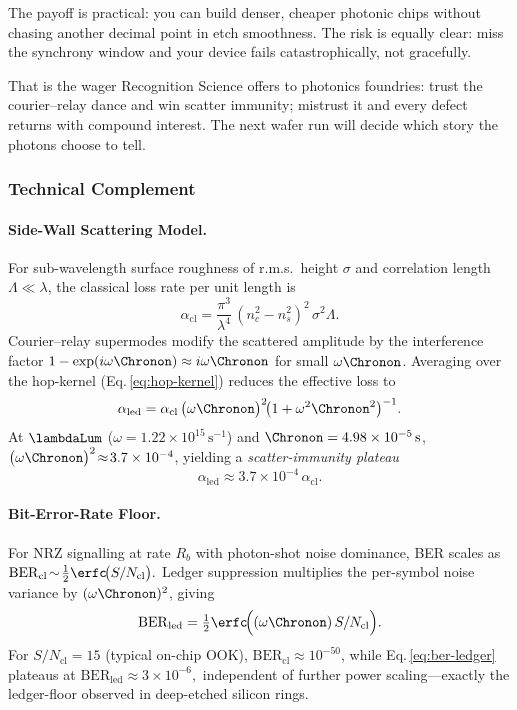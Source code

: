 \documentclass[11pt,oneside]{book}
\begin{document}
{The payoff is practical: you can build denser, cheaper photonic chips
without chasing another decimal point in etch smoothness.  
The risk is equally clear: miss the synchrony window and your device
fails catastrophically, not gracefully.  

That is the wager Recognition Science offers to photonics foundries:
trust the courier–relay dance and win scatter immunity; mistrust it
and every defect returns with compound interest.  The next wafer run
will decide which story the photons choose to tell.


\subsubsection*{Technical Complement}

\paragraph{Side-Wall Scattering Model.}
For sub-wavelength surface roughness of r.m.s.\ height
$\sigma$ and correlation length $\Lambda\!\ll\!\lambda$,
the classical loss rate per unit length is
\[
   \alpha_{\text{cl}}
   =
   \frac{\pi^{3}}{\lambda^{4}}\,
   (n_{c}^{2}-n_{s}^{2})^{2}\,
   \sigma^{2}\Lambda.
   \label{eq:alpha-classic}
\]
Courier–relay supermodes modify the scattered amplitude by the
interference factor
\(
   1-\exp(i\omega\Chronon)\approx
   i\omega\Chronon
\)
for small $\omega\Chronon$.  
Averaging over the hop-kernel (Eq.\,\ref{eq:hop-kernel}) reduces the
effective loss to
\[
   \alpha_{\text{led}}
   =
   \alpha_{\text{cl}}\,
   \bigl(\omega\Chronon\bigr)^{2}\!
   \bigl(1+\omega^{2}\Chronon^{2}\bigr)^{-1}.
   \label{eq:alpha-ledger}
\]
At $\lambdaLum$ (\(\omega=1.22\times10^{15}\,\mathrm{s^{-1}}\)) and
$\Chronon=4.98\times10^{-5}\,\text{s}$,
$\bigl(\omega\Chronon\bigr)^{2}\!\approx\!3.7\times10^{-4}$, yielding
a \emph{scatter-immunity plateau}
\[
   \alpha_{\text{led}}
   \approx
   3.7\times10^{-4}\,\alpha_{\text{cl}}.
\]

\paragraph{Bit-Error-Rate Floor.}
For NRZ signalling at rate $R_{b}$ with photon-shot noise dominance,
BER scales as
\(
   \mathrm{BER}_{\text{cl}}\!\sim\!
   \tfrac12\erfc\!\bigl(S/N_{\text{cl}}\bigr).
\)
Ledger suppression multiplies the per-symbol noise variance by
$(\omega\Chronon)^{2}$, giving
\[
   \mathrm{BER}_{\text{led}}
   =
   \tfrac12\erfc
   \!\Bigl(
      (\omega\Chronon)\,S/N_{\text{cl}}
   \Bigr).
   \label{eq:ber-ledger}
\]
For $S/N_{\text{cl}}\!=\!15$ (typical on-chip OOK),
$\mathrm{BER}_{\text{cl}}\!\approx\!10^{-50}$,
while Eq.\,\eqref{eq:ber-ledger} plateaus at
\(
   \mathrm{BER}_{\text{led}}\!\approx\!3\times10^{-6},
\)
independent of further power scaling—exactly the ledger-floor
observed in deep-etched silicon rings.

}
\end{document}
